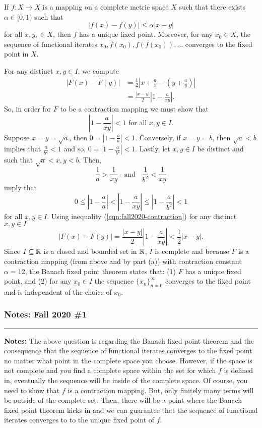 \documentclass{article}
\begin{document}
If $f: X\to X$ is a mapping on a complete metric space $X$ such that there exists $\alpha \in [0,1)$ such that 
\[|f(x) - f(y)|\leq \alpha |x-y|\]
for all $x,y,\in X$, then $f$ has a unique fixed point. Moreover, for any $x_0\in X$, the sequence of functional iterates $x_0, f(x_0), f(f(x_0)),\dots$ converges to the fixed point in $X$. 

For any distinct $x,y\in I$, we compute 
	\begin{align*}
		|F(x) - F(y)| & =\frac{1}{2} \left|x +\frac{a}{x} - \left(y +\frac{a}{y}\right)\right|\\
				  & = \frac{|x-y|}{2}\left|1 - \frac{a}{xy}\right|.
	\end{align*}
So, in order for $F$ to be a contraction mapping we must show that 
	\begin{equation}\label{eqn:fall2020-contraction}
		\left|1 - \frac{a}{xy}\right| < 1 \text{ for all } x,y\in I.
	\end{equation}
Suppose $x = y = \sqrt{a}$, then $0 = \left|1 - \frac{a}{a} \right| < 1$. Conversely, if $x = y = b$, then $\sqrt{a} < b$ implies that $\frac{a}{b^2} < 1$ and so, $0 = \left|1 - \frac{a}{b^2} \right| < 1$. Lastly, let $x,y\in I$ be distinct and such that $\sqrt{a} < x,y < b$. Then, 
	\begin{equation}\label{eqn:fall2020-inequality}
		\frac{1}{a} > \frac{1}{xy} \;\; \text{ and } \;\; \frac{1}{b^2} < \frac{1}{xy}
	\end{equation}
imply that 
\[ 0 \leq \left|1 - \frac{a}{a}\right| < \left|1 - \frac{a}{xy}\right|  \leq \left|1 - \frac{a}{b^2}\right| < 1 \]
for all $x,y\in I$. Using inequality (\ref{eqn:fall2020-contraction}) for any distinct $x,y\in I$
	\[ |F(x) - F(y)| = \frac{|x-y|}{2}\left|1 - \frac{a}{xy}\right| < \frac{1}{2}|x-y|.\]
Since $I\subseteq\mathbb R$ is a closed and bounded set in $\mathbb R$, $I$ is complete and because $F$ is a contraction mapping (from above and by part (a)) with contraction constant $\alpha = {1}{2}$, the Banach fixed point theorem states that: (1) $F$ has a unique fixed point, and (2) for any $x_0\in I$ the sequence $\{x_n\}_{n = 0}^\infty$ converges to the fixed point and is independent of the choice of $x_0$.

\break 

\subsubsection*{Notes: Fall 2020 \#1}

\hrule 

\textbf{Notes:} The above question is regarding the Banach fixed point theorem and the consequence that the sequence of functional iterates converges to the fixed point no matter what point in the complete space you choose. However, if the space is not complete and you find a complete space within the set for which $f$ is defined in, eventually the sequence will be inside of the complete space. Of course, you need to show that $f$ is a contraction mapping. But, only finitely many terms will be outside of the complete set. Then, there will be a point where the Banach fixed point theorem kicks in and we can guarantee that the sequence of functional iterates converges to to the unique fixed point of $f$.\\
\end{document}
